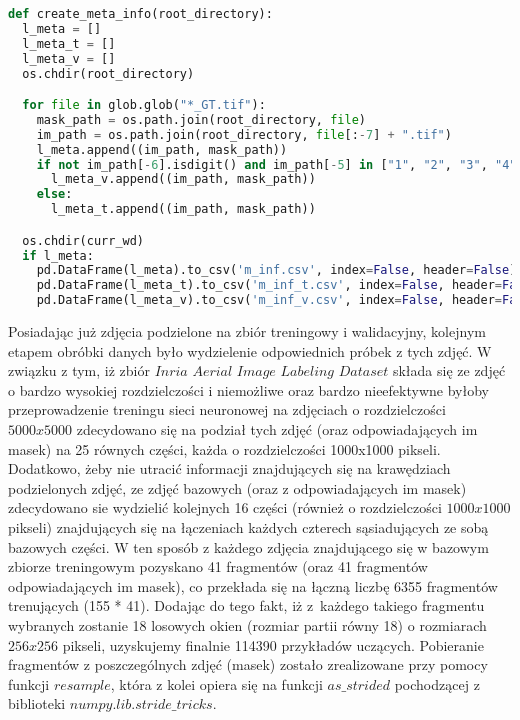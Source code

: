 \cell
\begin{lstlisting}[name=Rozdzial3.1, language=Python]
def create_meta_info(root_directory):    
  l_meta = [] 
  l_meta_t = []
  l_meta_v = []
  os.chdir(root_directory)

  for file in glob.glob("*_GT.tif"):
    mask_path = os.path.join(root_directory, file)
    im_path = os.path.join(root_directory, file[:-7] + ".tif")
    l_meta.append((im_path, mask_path))
    if not im_path[-6].isdigit() and im_path[-5] in ["1", "2", "3", "4", "5"]:
      l_meta_v.append((im_path, mask_path))
    else:
      l_meta_t.append((im_path, mask_path))

  os.chdir(curr_wd)
  if l_meta:
    pd.DataFrame(l_meta).to_csv('m_inf.csv', index=False, header=False)
    pd.DataFrame(l_meta_t).to_csv('m_inf_t.csv', index=False, header=False)
    pd.DataFrame(l_meta_v).to_csv('m_inf_v.csv', index=False, header=False)
\end{lstlisting}


\cell
Posiadając już zdjęcia podzielone na zbiór treningowy i walidacyjny, kolejnym etapem obróbki danych było wydzielenie odpowiednich próbek z tych zdjęć. W związku z tym, iż zbiór $\textit{Inria Aerial Image Labeling Dataset}$ składa się ze zdjęć o bardzo wysokiej rozdzielczości i niemożliwe oraz bardzo nieefektywne byłoby przeprowadzenie treningu sieci neuronowej na zdjęciach o rozdzielczości $\textit{5000x5000}$ zdecydowano się na podział tych zdjęć (oraz odpowiadających im masek) na 25 równych części, każda o rozdzielczości 1000x1000 pikseli. Dodatkowo, żeby nie utracić informacji znajdujących się na krawędziach podzielonych zdjęć, ze zdjęć bazowych (oraz z odpowiadających im masek) zdecydowano sie wydzielić kolejnych 16 części (również o rozdzielczości $\textit{1000x1000}$ pikseli) znajdujących się na łączeniach każdych czterech sąsiadujących ze sobą bazowych części. W ten sposób z każdego zdjęcia znajdującego się w bazowym zbiorze treningowym pozyskano 41 fragmentów (oraz 41 fragmentów odpowiadających im masek), co przekłada się na łączną liczbę 6355 fragmentów trenujących (155 * 41). Dodając do tego fakt, iż z~każdego takiego fragmentu wybranych zostanie 18 losowych okien (rozmiar partii równy 18) o rozmiarach $\textit{256x256}$ pikseli, uzyskujemy finalnie 114390 przykładów uczących. Pobieranie fragmentów z poszczególnych zdjęć (masek) zostało zrealizowane przy pomocy funkcji $\textit{resample}$, która z kolei opiera się na funkcji $\textit{as$\_$strided}$ pochodzącej z biblioteki $\textit{numpy.lib.stride$\_$tricks}$.


